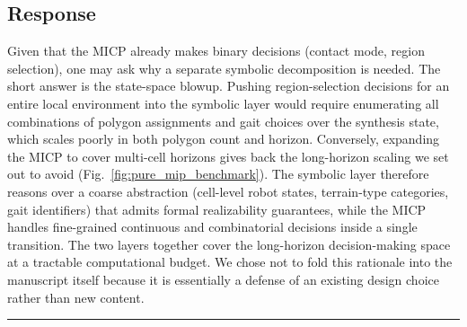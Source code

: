 \subsection{Response}
Given that the MICP already makes binary decisions (contact mode, region selection), one may ask why a separate symbolic decomposition is needed. The short answer is the state-space blowup. Pushing region-selection decisions for an entire local environment into the symbolic layer would require enumerating all combinations of polygon assignments and gait choices over the synthesis state, which scales poorly in both polygon count and horizon. Conversely, expanding the MICP to cover multi-cell horizons gives back the long-horizon scaling we set out to avoid (Fig.~\ref{fig:pure_mip_benchmark}). The symbolic layer therefore reasons over a coarse abstraction (cell-level robot states, terrain-type categories, gait identifiers) that admits formal realizability guarantees, while the MICP handles fine-grained continuous and combinatorial decisions inside a single transition. The two layers together cover the long-horizon decision-making space at a tractable computational budget. We chose not to fold this rationale into the manuscript itself because it is essentially a defense of an existing design choice rather than new content.

\noindent\rule{17cm}{6.0pt}
